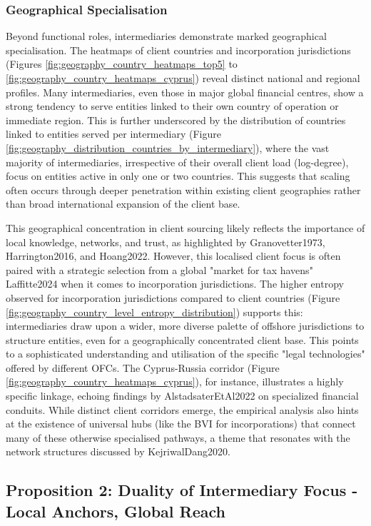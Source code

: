 \subsubsection*{Geographical Specialisation}
Beyond functional roles, intermediaries demonstrate marked geographical specialisation. The heatmaps of client countries and incorporation jurisdictions (Figures \ref{fig:geography_country_heatmaps_top5} to \ref{fig:geography_country_heatmaps_cyprus}) reveal distinct national and regional profiles. Many intermediaries, even those in major global financial centres, show a strong tendency to serve entities linked to their own country of operation or immediate region. This is further underscored by the distribution of countries linked to entities served per intermediary (Figure \ref{fig:geography_distribution_countries_by_intermediary}), where the vast majority of intermediaries, irrespective of their overall client load (log-degree), focus on entities active in only one or two countries. This suggests that scaling often occurs through deeper penetration within existing client geographies rather than broad international expansion of the client base.

This geographical concentration in client sourcing likely reflects the importance of local knowledge, networks, and trust, as highlighted by Granovetter1973, Harrington2016, and Hoang2022. However, this localised client focus is often paired with a strategic selection from a global "market for tax havens" Laffitte2024 when it comes to incorporation jurisdictions. The higher entropy observed for incorporation jurisdictions compared to client countries (Figure \ref{fig:geography_country_level_entropy_distribution}) supports this: intermediaries draw upon a wider, more diverse palette of offshore jurisdictions to structure entities, even for a geographically concentrated client base. This points to a sophisticated understanding and utilisation of the specific "legal technologies" offered by different OFCs. The Cyprus-Russia corridor (Figure \ref{fig:geography_country_heatmaps_cyprus}), for instance, illustrates a highly specific linkage, echoing findings by AlstadsaterEtAl2022 on specialized financial conduits. While distinct client corridors emerge, the empirical analysis also hints at the existence of universal hubs (like the BVI for incorporations) that connect many of these otherwise specialised pathways, a theme that resonates with the network structures discussed by KejriwalDang2020.

\subsection{Proposition 2: Duality of Intermediary Focus - Local Anchors, Global Reach}
\label{subsec:prop2_duality}

